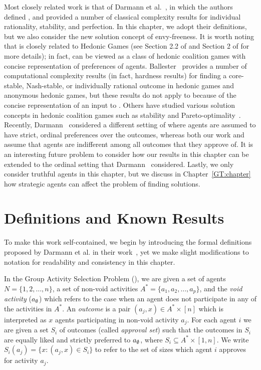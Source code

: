 Most closely related work is that of Darmann et al.~\cite{GASP12WINE}, in which the authors defined \GASP, and provided a number of classical complexity results for individual rationality, stability, and perfection.
In this chapter, we adopt their definitions, but we also consider the new solution concept of envy-freeness. It is worth noting that \GASPs is closely related to Hedonic Games (see Section 2.2 of \cite{GASP12WINE} and Section 2 of \cite{LEE15AAAI} for more details); in fact, \GASPs can be viewed as a class of hedonic coalition games with concise representation of preferences of agents.
Ballester~\cite{NP_hedonic} provides a number of computational complexity 
results (in fact, hardness results) for finding a core-stable, Nash-stable, or 
individually rational outcome in hedonic games and anonymous hedonic games, but these results do not apply to \GASPs because of the concise representation of an input to \GASP. Others have studied various solution concepts in hedonic coalition games such as stability and Pareto-optimality~\cite{BogomolnaiaJackson,DrezeGreenberg,AzizBrandl}.
Recently, Darmann~\cite{DARMANN15ADT} considered a different setting of \GASPs where agents are assumed to have strict, ordinal preferences over the outcomes, whereas both our work and \cite{GASP12WINE} assume that agents are indifferent among all outcomes that they approve of. It is an interesting future problem to consider how our results in this chapter can be extended to the ordinal setting that Darmann~\cite{DARMANN15ADT} considered. 
Lastly, we only consider truthful agents in this chapter, but we discuss in Chapter~\ref{GT:chapter} how strategic agents can affect the problem of finding solutions.
 
 
 
 
\section{Definitions and Known Results} \label{GASP:sec:prelim}

To make this work self-contained, we begin by introducing the formal definitions proposed by Darmann et al. in their work~\cite{GASP12WINE}, yet we make slight modifications to notation for readability and consistency in this chapter.


\begin{definition}
	In the Group Activity Selection Problem (\GASP), we are given a set of agents $N = \{1, 2, \dots, n\}$, a set of non-void activities $A^* =  \{a_1, a_2, \dots, a_p\}$, and the {\em void activity} ($a_{\emptyset}$) which refers to the case when an agent does not participate in any of the activities in $A^*$.
An {\em outcome} is a pair $(a_j, x) \in A^* \times [n]$ which is interpreted as $x$ agents participating in non-void activity $a_j$. 
For each agent $i$ we are given a set $S_i$ of outcomes (called {\em approval set}) such that the outcomes in $S_i$ are equally liked and strictly preferred to $a_{\emptyset}$, where $S_i \subseteq A^* \times [1,n]$.
We write $S_i(a_j) = \{x: (a_j, x)\in S_i\}$ to refer to the set of sizes which agent $i$ approves for activity $a_j$. 
\end{definition}

